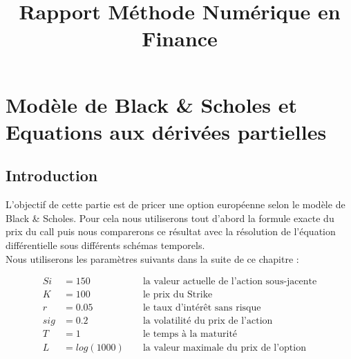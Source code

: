 \documentclass[11pt,a4paper]{report}
\title{Rapport Méthode Numérique en Finance}
\begin{document}
\chapter{Modèle de Black \& Scholes et Equations aux dérivées partielles}

\section{Introduction}

	L'objectif de cette partie est de pricer une option européenne selon le modèle de Black \& Scholes. Pour cela nous utiliserons tout d'abord la formule exacte du prix du call puis nous comparerons ce résultat avec la résolution de l'équation différentielle sous différents schémas temporels.\\
	Nous utiliserons les paramètres suivants dans la suite de ce chapitre :

\begin{align*}
  	Si &= 150& &\text{ la valeur actuelle de l'action sous-jacente} \\
  	K &= 100& &\text{ le prix du Strike} \\
	r &= 0.05& &\text{ le taux d'intérêt sans risque} \\
	sig &= 0.2&  &\text{ la volatilité du prix de l'action} \\
	T &= 1& &\text{ le temps à la maturité} \\
	L &= log(1000)& &\text{ la valeur maximale du prix de l'option}
\end{align*}
\end{document}
